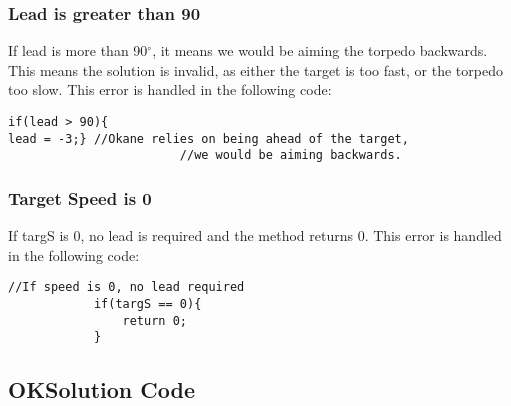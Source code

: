 \documentclass{article}
\newcommand{\degree}{$^{\circ}$}
\begin{document}
\subsubsection{Lead is greater than 90}
If lead is more than 90\degree , it means we would be aiming the torpedo backwards. This means the solution is invalid, as either the target is too fast, or the torpedo too slow. This error is handled in the following code:

\begin{lstlisting}
if(lead > 90){
lead = -3;} //Okane relies on being ahead of the target,
						//we would be aiming backwards.
\end{lstlisting}

\subsubsection{Target Speed is 0}
If targS is 0, no lead is required and the method returns 0.
This error is handled in the following code:

\begin{lstlisting}
//If speed is 0, no lead required
            if(targS == 0){
            	return 0;
            }
\end{lstlisting}

\subsection{OKSolution Code}
\end{document}
